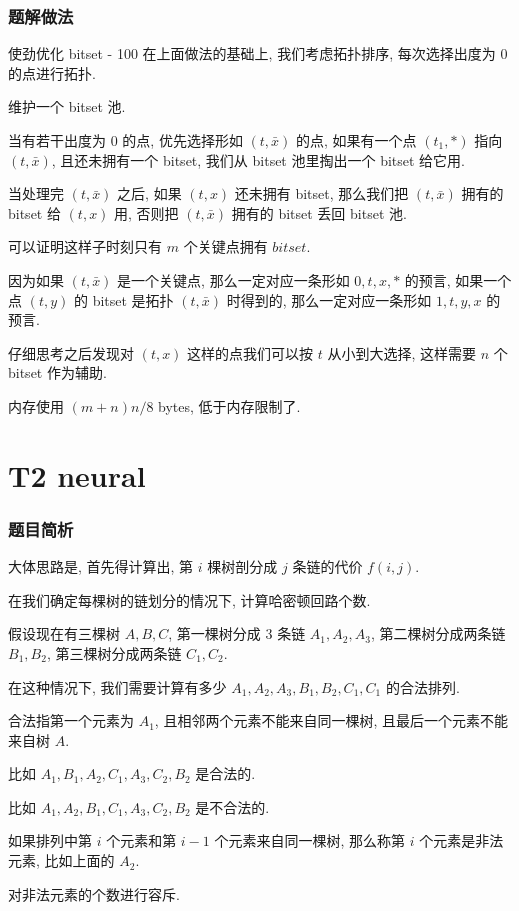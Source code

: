 \documentclass{beamer}
\begin{document}
\begin{frame}
\frametitle{题解做法}

\begin{block}{使劲优化 bitset - 100}
在上面做法的基础上, 我们考虑拓扑排序, 每次选择出度为 $0$ 的点进行拓扑.

维护一个 bitset 池.  

当有若干出度为 $0$ 的点, 优先选择形如 $(t, \bar{x})$ 的点, 
如果有一个点 $(t_1, *)$ 指向 $(t, \bar{x})$, 且还未拥有一个 bitset, 我们从 bitset 池里掏出一个 bitset 给它用.

当处理完 $(t, \bar{x})$ 之后, 如果 $(t, x)$ 还未拥有 bitset, 那么我们把 $(t, \bar{x})$ 拥有的 bitset 给 $(t, x)$ 用, 
否则把 $(t, \bar{x})$ 拥有的 bitset 丢回 bitset 池. 

可以证明这样子时刻只有 $m$ 个关键点拥有 $bitset$. 

因为如果 $(t, \bar{x})$ 是一个关键点, 那么一定对应一条形如 $0,t,x,*$ 的预言, 
如果一个点 $(t, y)$ 的 bitset 是拓扑 $(t, \bar{x})$ 时得到的, 那么一定对应一条形如 $1, t, y, x$ 的预言. 

仔细思考之后发现对 $(t, x)$ 这样的点我们可以按 $t$ 从小到大选择, 这样需要 $n$ 个 bitset 作为辅助. 

内存使用 $(m+n)n/8$ bytes, 低于内存限制了. 
\end{block}

\end{frame}


\section{T2 neural}
\begin{frame}
\frametitle{题目简析}

大体思路是, 首先得计算出, 第 $i$ 棵树剖分成 $j$ 条链的代价 $f(i, j)$. 

在我们确定每棵树的链划分的情况下, 计算哈密顿回路个数. 

假设现在有三棵树 $A, B, C$, 第一棵树分成 $3$ 条链 $A_1, A_2, A_3$, 第二棵树分成两条链 $B_1, B_2$, 第三棵树分成两条链 $C_1, C_2$. 

在这种情况下, 我们需要计算有多少 $A_1, A_2, A_3, B_1, B_2, C_1, C_1$ 的合法排列. 

合法指第一个元素为 $A_1$, 且相邻两个元素不能来自同一棵树, 且最后一个元素不能来自树 $A$. 

比如 $A_1, B_1, A_2, C_1, A_3, C_2, B_2$ 是合法的. 

比如 $A_1, A_2, B_1, C_1, A_3, C_2, B_2$ 是不合法的. 

如果排列中第 $i$ 个元素和第 $i-1$ 个元素来自同一棵树, 那么称第 $i$ 个元素是非法元素, 比如上面的 $A_2$. 

对非法元素的个数进行容斥. 

\end{frame}
\end{document}
